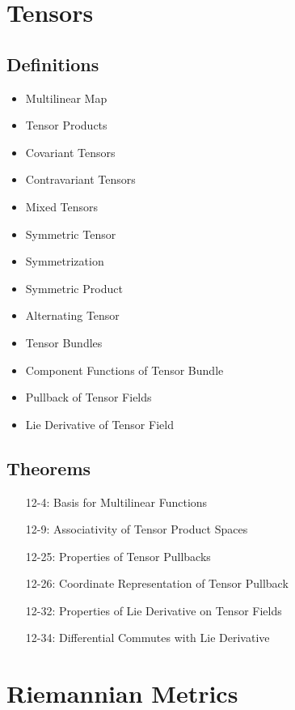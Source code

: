 \documentclass[11.5pt]{scrartcl}
\newcommand{\<}{\langle}
\renewcommand{\>}{\rangle}
\begin{document}
\section{Tensors}
\subsection{Definitions}
\begin{itemize}
\item Multilinear Map
\item Tensor Products
\item Covariant Tensors
\item Contravariant Tensors
\item Mixed Tensors
\item Symmetric Tensor
\item Symmetrization
\item Symmetric Product
\item Alternating Tensor
\item Tensor Bundles
\item Component Functions of Tensor Bundle
\item Pullback of Tensor Fields
\item Lie Derivative of Tensor Field
\end{itemize}
\subsection{Theorems}
\begin{itemize}
\item[12-4:] Basis for Multilinear Functions
\item[12-9:] Associativity of Tensor Product Spaces
\item[12-25:] Properties of Tensor Pullbacks
\item[12-26:] Coordinate Representation of Tensor Pullback 
\item[12-32:] Properties of Lie Derivative on Tensor Fields
\item[12-34:] Differential Commutes with Lie Derivative 
\end{itemize}
\section{Riemannian Metrics}
\end{document}
